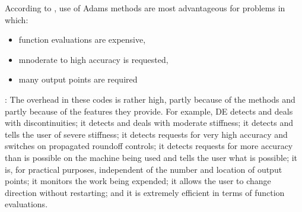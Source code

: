 
According to \cite{Shampine1975}, use of Adams methods are most advantageous for 
problems in which:
\begin{itemize}
    \item function evaluations are expensive,
    \item mnoderate to high accuracy is requested,
    \item many output points are required
\end{itemize}

\cite{Shampine1975}:
The overhead in these codes is rather high, partly because of the methods
and partly because of the features they provide. For example, DE detects
and deals with discontinuities; it detects and deals with moderate stiffness;
it detects and tells the user of severe stiffness; it detects requests for very
high accuracy and switches on propagated roundoff controls; it detects
requests for more accuracy than is possible on the machine being used and
tells the user what is possible; it is, for practical purposes, independent
of the number and location of output points; it monitors the work being
expended; it allows the user to change direction without restarting; and
it is extremely efficient in terms of function evaluations. 

